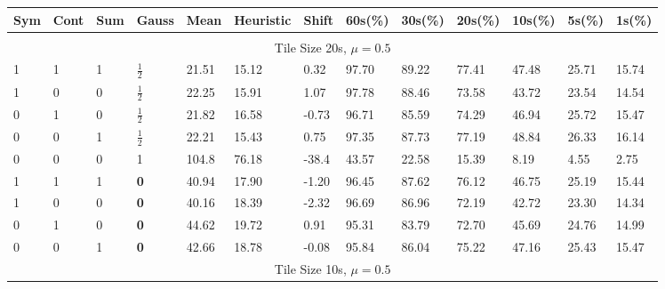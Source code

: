 \documentclass[twocolumn]{article}
\begin{document}
\begin{table}[t]
\centering
	\begin{tabular}{lllllllllllll}
		\hline 
	
			Sym & Cont  & Sum  &  Gauss   & Mean & Heuristic & Shift & 60s(\%) & 30s(\%) & 20s(\%) & 10s(\%) & 5s(\%) & 1s(\%)    \\ \hline 
			
	
\multicolumn{13}{c}{\textbf{}} \\

\multicolumn{13}{c}{{Tile Size 20s}, $\mu=0.5$}  \vspace{0.3cm}      
\\

1 & 1 & 1 & $\frac{1}{2}$ &  21.51    & 15.12          &  0.32      & 97.70    &  89.22   &  77.41   & 47.48    & 25.71   & 15.74   \\ [1ex]
1 & 0 & 0 & $\frac{1}{2}$ &  22.25    & 15.91          &  1.07      & 97.78    &  88.46   &  73.58   & 43.72    & 23.54   & 14.54   \\ [1ex]
0 & 1 & 0 & $\frac{1}{2}$ &  21.82    & 16.58          &  -0.73     & 96.71    &  85.59   &  74.29   & 46.94    & 25.72   & 15.47   \\ [1ex]
0 & 0 & 1 & $\frac{1}{2}$ &  22.21    & 15.43          &  0.75      & 97.35    &  87.73   &  77.19   & 48.84    & 26.33   & 16.14   \\ [1ex]
0 & 0 & 0 & 1             &  104.8    & 76.18          &  -38.4     & 43.57    &  22.58   &  15.39   & 8.19     & 4.55    & 2.75 \vspace{0.3cm}  \\ 

1 & 1 & 1 & \textbf{0} &  40.94    &    17.90       &   -1.20   &   96.45  &   87.62  &   76.12  &  46.75   &  25.19  &  15.44  \\ [1ex]
1 & 0 & 0 & \textbf{0} &  40.16    &    18.39       &   -2.32    &  96.69   &  86.96   &  72.19   & 42.72    & 23.30   & 14.34   \\ [1ex]
0 & 1 & 0 & \textbf{0} &  44.62    &    19.72       &   0.91     &  95.31   &  83.79   &  72.70   & 45.69    & 24.76   & 14.99   \\ [1ex]
0 & 0 & 1 & \textbf{0} &  42.66    &    18.78       &   -0.08    &  95.84   &  86.04   &  75.22   & 47.16    & 25.43   & 15.47   \\ [1ex]


\multicolumn{13}{c}{{Tile Size 10s}, $\mu=0.5$}  \vspace{0.3cm}         
\\


\end{tabular}
\end{table}
\end{document}
